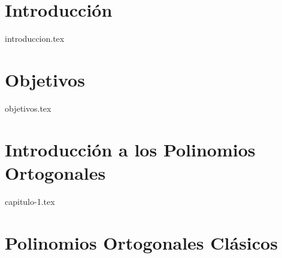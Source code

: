 \documentclass[twoside,openright,11pt]{report}
\begin{document}
\begin{comment}
    

\chapter*{Lista de Abreviaturas}

{lista-abreviaturas.tex}
\addcontentsline{toc}{chapter}{Lista de Abreviaturas}

\listoffigures
\thispagestyle{plain}
\addcontentsline{toc}{chapter}{Lista de Imágenes}


\end{comment}


\chapter*{Introducción}

{introduccion.tex}

\chapter*{Objetivos}
\label{chap:Objetivos}

{objetivos.tex}

\chapter{Introducción a los Polinomios Ortogonales}
\label{chap:introduccionPO}

{capitulo-1.tex}

\chapter{Polinomios Ortogonales Clásicos}
\label{chap:clasicos}
\end{document}
